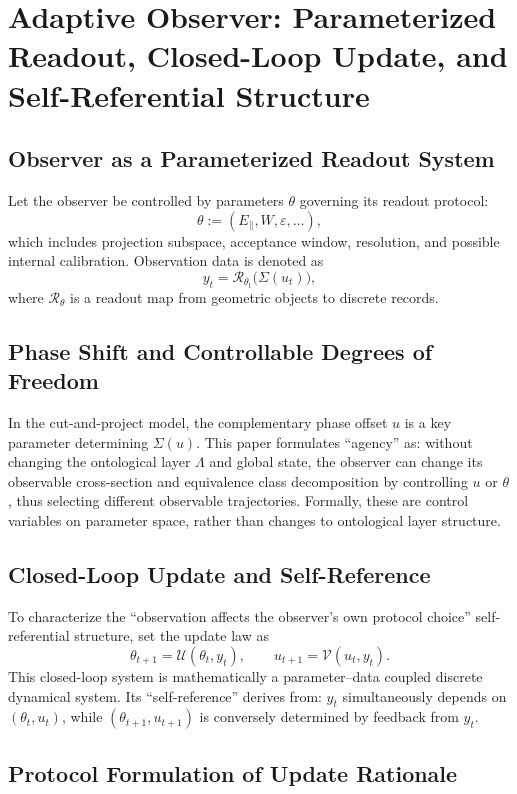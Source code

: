 \section{Adaptive Observer: Parameterized Readout, Closed-Loop Update, and Self-Referential Structure}

\subsection{Observer as a Parameterized Readout System}

Let the observer be controlled by parameters $\theta$ governing its readout protocol:
\[
\theta := (E_{\parallel},W,\varepsilon,\ldots),
\]
which includes projection subspace, acceptance window, resolution, and possible internal calibration. Observation data is denoted as
\[
y_t = \mathcal{R}_{\theta_t}\big(\Sigma(u_t)\big),
\]
where $\mathcal{R}_{\theta}$ is a readout map from geometric objects to discrete records.

\subsection{Phase Shift and Controllable Degrees of Freedom}

In the cut-and-project model, the complementary phase offset $u$ is a key parameter determining $\Sigma(u)$. This paper formulates ``agency'' as: without changing the ontological layer $\Lambda$ and global state, the observer can change its observable cross-section and equivalence class decomposition by controlling $u$ or $\theta$, thus selecting different observable trajectories. Formally, these are control variables on parameter space, rather than changes to ontological layer structure.

\subsection{Closed-Loop Update and Self-Reference}

To characterize the ``observation affects the observer's own protocol choice'' self-referential structure, set the update law as
\[
\theta_{t+1} = \mathcal{U}(\theta_t, y_t),
\qquad
u_{t+1} = \mathcal{V}(u_t, y_t).
\]
This closed-loop system is mathematically a parameter--data coupled discrete dynamical system. Its ``self-reference'' derives from: $y_t$ simultaneously depends on $(\theta_t,u_t)$, while $(\theta_{t+1},u_{t+1})$ is conversely determined by feedback from $y_t$.

\subsection{Protocol Formulation of Update Rationale}

